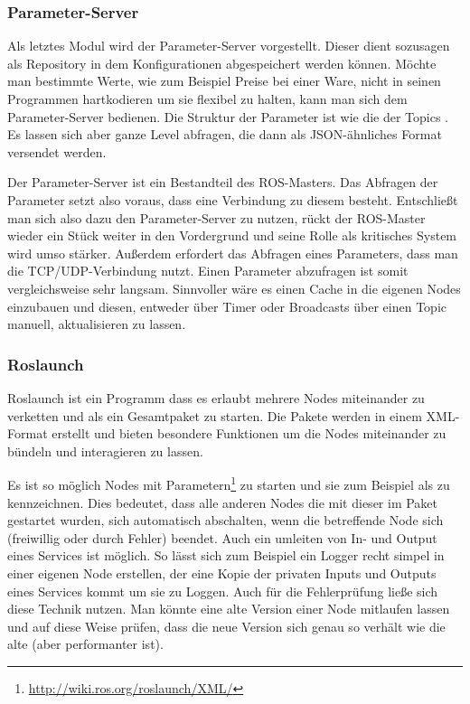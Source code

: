 \subsubsection*{Parameter-Server}
Als letztes Modul wird der Parameter-Server vorgestellt\cite{ROS_SERVER}. Dieser dient sozusagen als Repository in dem Konfigurationen abgespeichert werden können. Möchte man bestimmte Werte, wie zum Beispiel Preise bei einer Ware, nicht in seinen Programmen hartkodieren um sie flexibel zu halten, kann man sich dem Parameter-Server bedienen. Die Struktur der Parameter ist wie die der Topics . Es lassen sich aber ganze Level abfragen, die dann als JSON-ähnliches Format versendet werden.

Der Parameter-Server ist ein Bestandteil des \ac{ROS}-Masters. Das Abfragen der Parameter setzt also voraus, dass eine Verbindung zu diesem besteht. Entschließt man sich also dazu den Parameter-Server zu nutzen, rückt der \ac{ROS}-Master wieder ein Stück weiter in den Vordergrund und seine Rolle als kritisches System wird umso stärker. Außerdem erfordert das Abfragen eines Parameters, dass man die TCP/UDP-Verbindung nutzt. Einen Parameter abzufragen ist somit vergleichsweise sehr langsam. Sinnvoller wäre es einen Cache in die eigenen Nodes einzubauen und diesen, entweder über Timer oder Broadcasts über einen Topic manuell, aktualisieren zu lassen.

\newpage\subsubsection*{Roslaunch}
Roslaunch ist ein Programm dass es erlaubt mehrere Nodes miteinander zu verketten und als ein Gesamtpaket zu starten\cite{ROS_LAUNCH}. Die Pakete werden in einem XML-Format erstellt und bieten besondere Funktionen um die Nodes miteinander zu bündeln und interagieren zu lassen.

Es ist so möglich Nodes mit Parametern\footnote{\url{http://wiki.ros.org/roslaunch/XML/}} zu starten und sie zum Beispiel als  zu kennzeichnen. Dies bedeutet, dass alle anderen Nodes die mit dieser im Paket gestartet wurden, sich automatisch abschalten, wenn die betreffende Node sich (freiwillig oder durch Fehler) beendet.
Auch ein umleiten von In- und Output eines Services ist möglich. So lässt sich zum Beispiel ein Logger recht simpel in einer eigenen Node erstellen, der eine Kopie der privaten Inputs und Outputs eines Services kommt um sie zu Loggen. Auch für die Fehlerprüfung ließe sich diese Technik nutzen. Man könnte eine alte Version einer Node mitlaufen lassen und auf diese Weise prüfen, dass die neue Version sich genau so verhält wie die alte (aber performanter ist).

